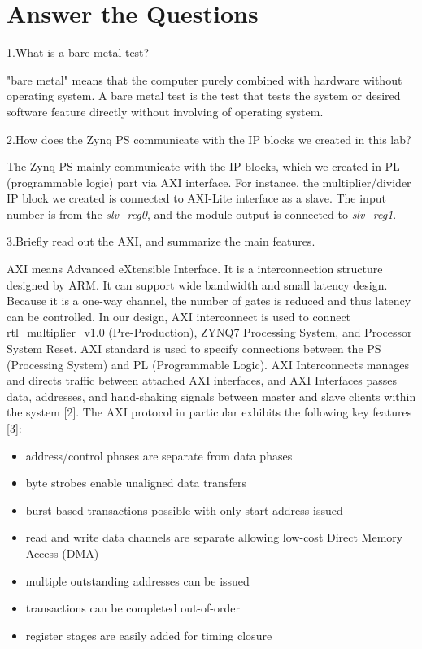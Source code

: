 \documentclass[a4paper]{article}
\begin{document}
\section{Answer the Questions}
1.What is a bare metal test?
\par
"bare metal" means that the computer purely combined with hardware without operating system. A bare metal test is the test that tests the system or desired software feature directly without involving of operating system.
\par
2.How does the Zynq PS communicate with the IP blocks we created in this lab?
\par
The Zynq PS mainly communicate with the IP blocks, which we created in PL (programmable logic) part via AXI interface. For instance, the multiplier/divider IP block we created is connected to AXI-Lite interface as a slave. The input number is from the \textit{slv\_reg0}, and the module output is connected to \textit{slv\_reg1}. 
\par
3.Briefly read out the AXI, and summarize the main features.
\par
AXI means Advanced eXtensible Interface. It is a interconnection structure designed by ARM. It can support wide bandwidth and small latency design. Because it is a one-way channel, the number of gates is reduced and thus latency can be controlled. In our design, AXI interconnect is used to connect rtl\_multiplier\_v1.0 (Pre-Production), ZYNQ7 Processing System, and Processor System Reset. AXI standard is used to specify connections between the PS (Processing System) and PL (Programmable Logic). AXI Interconnects manages and directs traffic between attached AXI interfaces, and AXI Interfaces passes data, addresses, and hand-shaking signals between master and slave clients within the system [2]. The AXI protocol in particular exhibits the following key features [3]:
\begin{itemize}
    \item address/control phases are separate from data phases
    \item byte strobes enable unaligned data transfers
    \item burst-based transactions possible with only start address issued
    \item read and write data channels are separate allowing low-cost Direct Memory Access (DMA)
    \item multiple outstanding addresses can be issued
    \item transactions can be completed out-of-order
    \item register stages are easily added for timing closure
\end{itemize}
\end{document}
